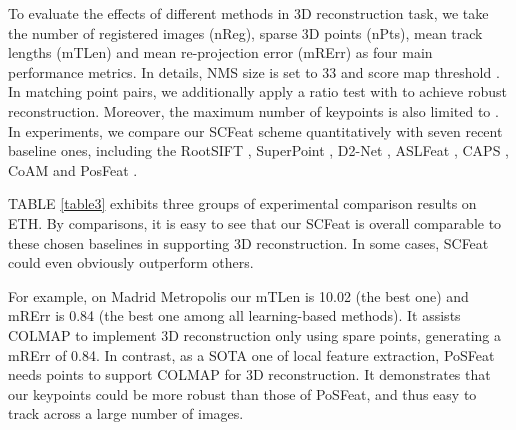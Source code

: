 \documentclass[journal]{IEEEtran}
\begin{document}
To evaluate the effects of different methods in 3D reconstruction task, we take the number of registered images (nReg), sparse 3D points (nPts), mean track lengths (mTLen) and mean re-projection error (mRErr) as four main performance metrics. In details, NMS size  is set to 33 and score map threshold . In matching point pairs, we additionally apply a ratio test \cite{hcrt:21} with  to achieve robust reconstruction. Moreover, the maximum number of keypoints is also limited to .
In experiments, we compare our SCFeat scheme quantitatively with seven recent baseline ones, including the RootSIFT \cite{hcrt:21}, SuperPoint \cite{SuperPoint}, D2-Net \cite{D2net}, ASLFeat \cite{aslfeat}, CAPS \cite{caps}, CoAM \cite{CoAM} and PosFeat \cite{li2022decoupling}. 


TABLE \ref{table3} exhibits three groups of experimental comparison results on ETH.
By comparisons, it is easy to see that our SCFeat is overall comparable to these chosen baselines in supporting 3D reconstruction. In some cases, 
SCFeat could even obviously outperform others.


For example, on Madrid Metropolis our mTLen is 10.02 (the best one) and mRErr is 0.84 (the best one among all learning-based methods). It assists COLMAP to implement 3D reconstruction only using 
 spare points, generating a mRErr of 0.84. In contrast, as a SOTA one of local feature extraction, PoSFeat needs 
 points to support COLMAP for 3D reconstruction. 
It demonstrates that our keypoints could be more robust than those of PoSFeat, and thus easy to track across a large number of images. 
\end{document}
